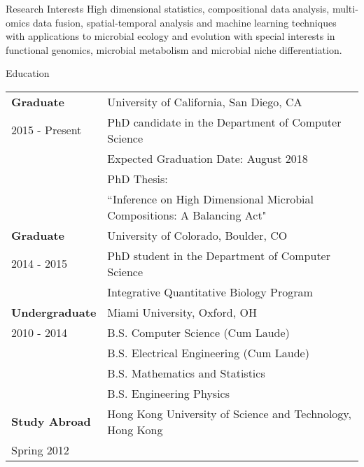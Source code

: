 \documentclass{resume} %
\begin{document}

\begin{rSection}{Research Interests}
  High dimensional statistics, compositional data analysis, multi-omics data fusion, spatial-temporal analysis and machine learning techniques with applications to microbial ecology and evolution with special interests in functional genomics, microbial metabolism and microbial niche differentiation.
\end{rSection}
\begin{rSection}{Education}
  \begin{tabular}{ll}
    \textbf{Graduate}      & University of California, San Diego, CA  \\
    2015 - Present  & PhD candidate in the Department of Computer Science \\
                    & Expected Graduation Date: August 2018\\
                    & PhD Thesis: \\
                    & ``Inference on High Dimensional Microbial Compositions: A Balancing Act"\\
    \textbf{Graduate}      & University of Colorado, Boulder, CO \\
    2014 - 2015   & PhD student in the Department of Computer Science \\
                  & Integrative Quantitative Biology Program \\
    \textbf{Undergraduate} & Miami University, Oxford, OH \\
    2010 - 2014   & B.S. Computer Science (Cum Laude)\\
    & B.S. Electrical Engineering (Cum Laude)\\
    & B.S. Mathematics and Statistics \\
    & B.S. Engineering Physics \\
    \textbf{Study Abroad} &  Hong Kong University of Science and Technology, Hong Kong   \\
    Spring 2012 \\
  \end{tabular}
\end{rSection}
\end{document}
